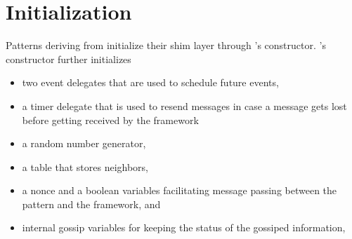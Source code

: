 \section {Initialization} \label{sec:Initialization}
Patterns deriving from  initialize their shim layer through 's constructor. 
's constructor further initializes 
\begin{itemize}
	\item two event delegates that are used to schedule
	future events, 
	\item a timer delegate that is used to resend messages in case a message gets lost before getting received by the framework
	\item a random number generator,
	\item a table that stores neighbors,
	\item a nonce and a boolean variables facilitating message passing between the pattern and the framework, and 
	\item internal gossip variables for keeping the status of the gossiped information,
\end{itemize}


